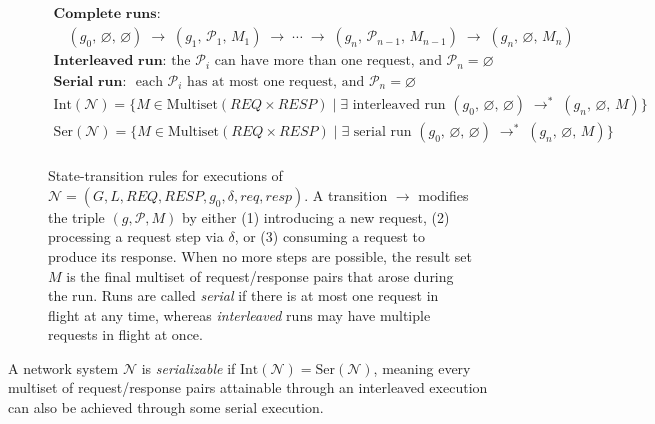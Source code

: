 \begin{figure}[t]
    \[
    \begin{array}{c}
    \textbf{Complete runs:}
    \\
    \quad (g_0,\,\varnothing,\,\varnothing) \;\longrightarrow\; (g_1,\,\mathcal{P}_1,\,M_1) \;\longrightarrow\; \cdots \;\longrightarrow\; (g_n,\,\mathcal{P}_{n-1},\,M_{n-1}) \;\longrightarrow\; (g_n,\,\varnothing,\,M_n)
    \\[1em]
    \textbf{Interleaved run: } \text{the } \mathcal{P}_i \text{ can have more than one request, and } \mathcal{P}_n = \varnothing \\
    \textbf{Serial run: } \text{ each } \mathcal{P}_i \text{ has at most one request, and } \mathcal{P}_n = \varnothing\\
    \text{Int}(\mathcal{N}) = \{ M \in \text{Multiset}(\mathit{REQ} \times \mathit{RESP}) \mid \exists \text{ interleaved run } (g_0,\,\varnothing,\,\varnothing) \;\longrightarrow^*\; (g_n,\,\varnothing,\,M) \}\\
    \text{Ser}(\mathcal{N}) = \{ M \in \text{Multiset}(\mathit{REQ} \times \mathit{RESP}) \mid \exists \text{ serial run } (g_0,\,\varnothing,\,\varnothing) \;\longrightarrow^*\; (g_n,\,\varnothing,\,M) \}\\
    \end{array}
    \]

    \caption{State-transition rules for executions of
    \(\mathcal{N} = (G, L, \mathit{REQ}, \mathit{RESP}, g_0, \delta, \mathit{req}, \mathit{resp})\).
    A transition \(\longrightarrow\) modifies the triple \((g,\mathcal{P}, M)\) by either (1) introducing a new request, (2) processing a request step via \(\delta\), or (3) consuming a request to produce its response.  When no more steps are possible, the result set \(M\) is the final multiset of request/response pairs that arose during the run.
    Runs are called \emph{serial} if there is at most one request in flight at any time, whereas \emph{interleaved} runs may have multiple requests in flight at once.}
    \label{fig:network-transitions}
\end{figure}

\begin{definition}[Serializability]
A network system $\mathcal{N}$ is \emph{serializable} if $\text{Int}(\mathcal{N}) = \text{Ser}(\mathcal{N})$, meaning every multiset of request/response pairs attainable through an interleaved execution can also be achieved through some serial execution.
\end{definition}


